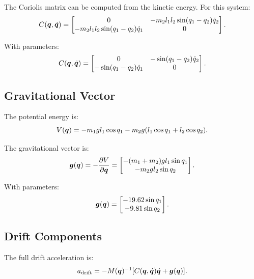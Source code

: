 The Coriolis matrix can be computed from the kinetic energy. For this system:
\begin{equation}
C(\bm{q},\dot{\bm{q}}) = \begin{bmatrix}
0 & -m_2 l_1 l_2 \sin(q_1-q_2)\dot{q}_2\\
-m_2 l_1 l_2 \sin(q_1-q_2)\dot{q}_1 & 0
\end{bmatrix}.
\label{eq:ch7:coriolis-matrix}
\end{equation}

With parameters:
\begin{equation}
C(\bm{q},\dot{\bm{q}}) = \begin{bmatrix}
0 & -\sin(q_1-q_2)\dot{q}_2\\
-\sin(q_1-q_2)\dot{q}_1 & 0
\end{bmatrix}.
\label{eq:ch7:coriolis-matrix-numeric}
\end{equation}

\subsection{Gravitational Vector}

The potential energy is:
\begin{equation}
V(\bm{q}) = -m_1 g l_1 \cos q_1 - m_2 g(l_1\cos q_1 + l_2 \cos q_2).
\end{equation}

The gravitational vector is:
\begin{equation}
\bm{g}(\bm{q}) = -\frac{\partial V}{\partial\bm{q}} = \begin{bmatrix}
-(m_1+m_2)g l_1 \sin q_1\\
-m_2 g l_2 \sin q_2
\end{bmatrix}.
\label{eq:ch7:grav-vector}
\end{equation}

With parameters:
\begin{equation}
\bm{g}(\bm{q}) = \begin{bmatrix}
-19.62 \sin q_1\\
-9.81 \sin q_2
\end{bmatrix}.
\label{eq:ch7:grav-vector-numeric}
\end{equation}

\subsection{Drift Components}

The full drift acceleration is:
\begin{equation}
a_{\text{drift}} = -M(\bm{q})^{-1}[C(\bm{q},\dot{\bm{q}})\dot{\bm{q}} + \bm{g}(\bm{q})].
\label{eq:ch7:drift-full}
\end{equation}

